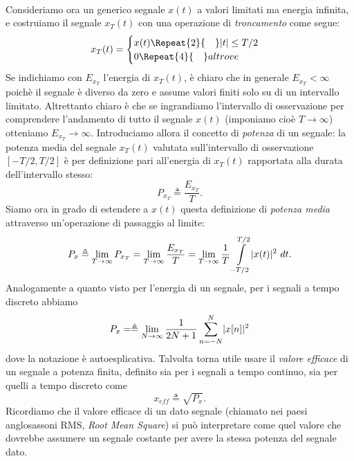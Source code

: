 \documentclass[12pt,oneside,openany]{memoir}
\numberwithin{equation}{subsection}
\DeclarePairedDelimiter{\abs}{\lvert}{\rvert}
\newcommand{\quads}[1]{\Repeat{#1}{\quad}}
\newcommand{\dt}{\ dt}
\begin{document}
\\
Consideriamo ora un generico segnale $x(t)$ a valori limitati ma energia infinita, e costruiamo il segnale $x_T(t)$ con una operazione di \textit{troncamento} come segue:
\begin{equation}
	x_T(t) =	\begin{cases}
				x(t) \quads{2} \abs{t} \leq T/2\\
				0 \quads{4} altrove
			\end{cases}
\end{equation}
Se indichiamo con $E_{x_T}$ l'energia di $x_T(t)$, \`e chiaro che in generale $E_{x_T} < \infty$ poich\`e il segnale \`e diverso da zero e assume valori finiti solo su di un intervallo limitato. Altrettanto chiaro \`e che se ingrandiamo l'intervallo di osservazione per comprendere l'andamento di tutto il segnale $x(t)$ (imponiamo cio\`e $T \rightarrow \infty$) otteniamo $E_{x_T} \rightarrow \infty$. Introduciamo allora il concetto di \textit{potenza} di un segnale: la potenza media del segnale $x_T(t)$ valutata sull'intervallo di osservazione $\left[-T/2, T/2\right]$ \`e per definizione pari all'energia di $x_T(t)$ rapportata alla durata dell'intervallo stesso:
\begin{equation}
	P_{x_T} \triangleq \frac{E_{x_T}}{T}.
\end{equation}
Siamo ora in grado di estendere a $x(t)$ questa definizione di \textit{potenza media} attraverso un'operazione di passaggio al limite:
\begin{equation}\label{eq:signal_power}
	P_x \triangleq \lim_{T \rightarrow \infty} P_{x_T} = \lim_{T \rightarrow \infty} \frac{E_{x_T}}{T} = \lim_{T \rightarrow \infty} \frac{1}{T} \int\displaylimits_{-T/2}^{T/2} \abs{x(t)}^2 \dt.
\end{equation}
Analogamente a quanto visto per l'energia di un segnale, per i segnali a tempo discreto abbiamo
\begin{equation}
	P_x = \triangleq \lim_{N \rightarrow \infty} \frac{1}{2N + 1} \sum_{n = -N}^{N} \abs{x[n]}^2
\end{equation}
dove la notazione \`e autoesplicativa.
Talvolta torna utile usare il \textit{valore efficace} di un segnale a potenza finita, definito sia per i segnali a tempo continuo, sia per quelli a tempo discreto come
\begin{equation}
	x_{eff} \triangleq \sqrt{P_x}.
\end{equation}
Ricordiamo che il valore efficace di un dato segnale (chiamato nei paesi anglosassoni RMS, \textit{Root Mean Square}) si pu\`o interpretare come quel valore che dovrebbe assumere un segnale costante per avere la stessa potenza del segnale dato.\\
\end{document}
